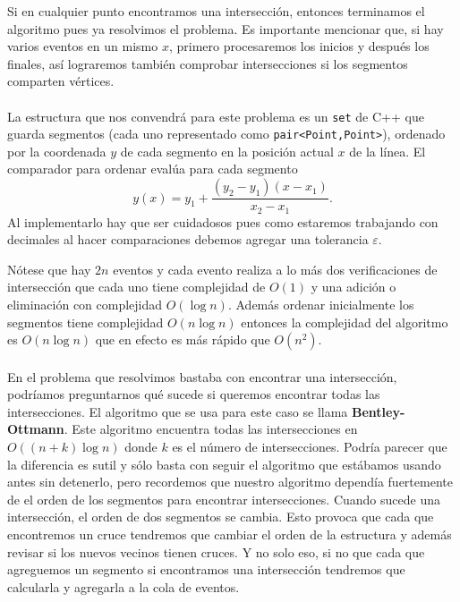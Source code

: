 Si en cualquier punto encontramos una intersección, entonces terminamos el algoritmo pues ya resolvimos el problema. Es importante mencionar que, si hay varios eventos en un mismo $x$, primero procesaremos los inicios y después los finales, así lograremos también comprobar intersecciones si los segmentos comparten vértices.
\\\\La estructura que nos convendrá para este problema es un \texttt{set} de C++ que guarda segmentos (cada uno representado como \texttt{pair<Point,Point>}), ordenado por la coordenada $y$ de cada segmento en la posición actual $x$ de la línea. El comparador para ordenar evalúa para cada segmento
\[y(x) = y_1 + \frac{(y_2 - y_1)(x - x_1)}{x_2 - x_1}.\] Al implementarlo hay que ser cuidadosos pues como estaremos trabajando con decimales al hacer comparaciones debemos agregar una tolerancia $\varepsilon$.

Nótese que hay $2n$ eventos y cada evento realiza a lo más dos verificaciones de intersección que cada uno tiene complejidad de $O(1)$ y una adición o eliminación con complejidad  $O(\log n)$. Además ordenar inicialmente los segmentos tiene complejidad $O(n\log n)$ entonces la complejidad del algoritmo es $O(n\log n)$ que en efecto es más rápido que $O(n^2)$.
\\\\En el problema que resolvimos bastaba con encontrar una intersección, podríamos preguntarnos qué sucede si queremos encontrar todas las intersecciones. El algoritmo que se usa para este caso se llama \textbf{Bentley-Ottmann}. Este algoritmo encuentra todas las intersecciones en $O((n+k)\log n)$ donde $k$ es el número de intersecciones. Podría parecer que la diferencia es sutil y sólo basta con seguir el algoritmo que estábamos usando antes sin detenerlo, pero recordemos que nuestro algoritmo dependía fuertemente de el orden de los segmentos para encontrar intersecciones. Cuando sucede una intersección, el orden de dos segmentos se cambia. Esto provoca que cada que encontremos un cruce tendremos que cambiar el orden de la estructura y además revisar si los nuevos vecinos tienen cruces. Y no solo eso, si no que cada que agreguemos un segmento si encontramos una intersección tendremos que calcularla y agregarla a la cola de eventos.

